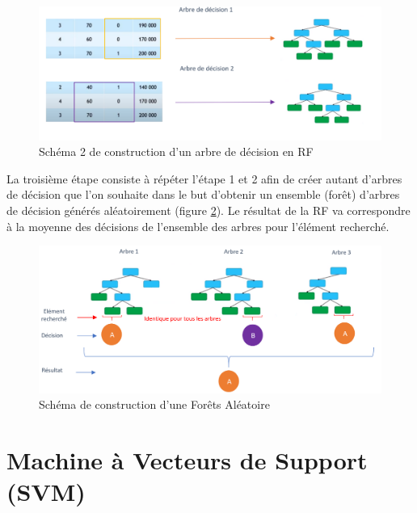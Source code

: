 \documentclass[
  11pt,
  french,
  a4paper,
  extrafontsizes,onecolumn,openright
  ]{memoir}
\begin{document}
\scriptsize

\begin{figure}

{\centering \includegraphics[width=0.8\linewidth]{Images/Figure12} 

}

\caption{Schéma 2 de construction d’un arbre de décision en RF}\label{fig:12}
\end{figure}

\normalsize

La troisième étape consiste à répéter l'étape 1 et 2 afin de créer autant d'arbres de décision que l'on souhaite dans le but d'obtenir un ensemble (forêt) d'arbres de décision générés aléatoirement (figure \ref{fig:13}\autocite{moutarde_arbres_2017}).
Le résultat de la RF va correspondre à la moyenne des décisions de l'ensemble des arbres pour l'élément recherché.

\scriptsize

\begin{figure}

{\centering \includegraphics[width=0.8\linewidth]{Images/Figure13} 

}

\caption{Schéma de construction d’une Forêts Aléatoire}\label{fig:13}
\end{figure}

\normalsize

\vfill
\newpage

\hypertarget{machine-uxe0-vecteurs-de-support-svm}{%
\section{Machine à Vecteurs de Support (SVM)}\label{machine-uxe0-vecteurs-de-support-svm}}
\end{document}
